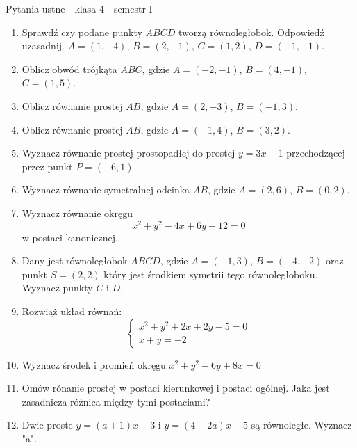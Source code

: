 \documentclass[12pt,a4paper]{article}
\begin{document}
	\begin{center}
		\LARGE Pytania ustne - klasa 4 - semestr I
	\end{center}
	\vspace{1.5cm}
	\begin{enumerate}[1.]
		
		\item Sprawdź czy podane punkty $ABCD$ tworzą równoległobok. Odpowiedź uzasadnij.\newline
		$A=(1,-4)$, $B=(2,-1)$, $C=(1,2)$, $D=(-1,-1)$.
		
		\item Oblicz obwód trójkąta $ABC$, gdzie $A=(-2,-1)$, $B=(4,-1)$, $C=(1,5)$.
		
		\item Oblicz równanie prostej $AB$, gdzie $A=(2,-3)$, $B=(-1,3)$.
		
		\item Oblicz równanie prostej $AB$, gdzie $A=(-1,4)$, $B=(3,2)$.
		
		\item Wyznacz równanie prostej prostopadłej do prostej $y=3x-1$ przechodzącej przez punkt $P=(-6,1)$.
		
		\item Wyznacz równanie symetralnej odcinka $AB$, gdzie $A=(2,6)$, $B=(0,2)$.
		
		\item Wyznacz równanie okręgu
		$$x^2+y^2-4x+6y-12=0$$
		w postaci kanonicznej.
		
		\item Dany jest równoległobok $ABCD$, gdzie $A=(-1,3)$, $B=(-4,-2)$ oraz punkt $S=(2,2)$ który jest środkiem symetrii tego równoległoboku. Wyznacz punkty $C$ i $D$.
		
		\item		Rozwiąż układ równań:
$$\left\{\begin{array}{l}
x^2+y^2+2x+2y-5=0\\
x+y=-2
\end{array}\right.$$

		\item Wyznacz środek i promień okręgu $x^2+y^2-6y+8x=0$
		
		\item Omów rónanie prostej w postaci kierunkowej i postaci ogólnej. Jaka jest zasadnicza różnica między tymi postaciami?
		
		\item Dwie proste $y=(a+1)x-3$ i $y=(4-2a)x-5$ są równoległe. Wyznacz "a".
		

\end{enumerate}
\end{document}
